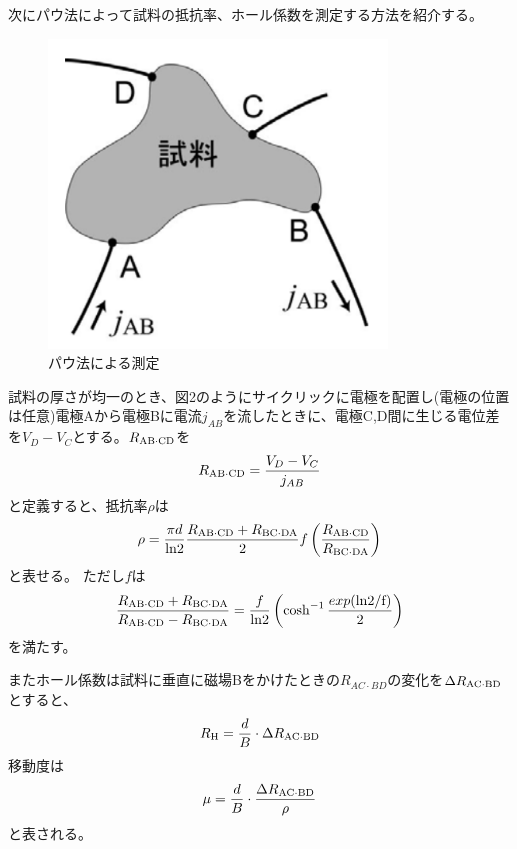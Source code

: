 \documentclass[dvipdfmx]{jsarticle}
\begin{document}
次にパウ法によって試料の抵抗率、ホール係数を測定する方法を紹介する。
\begin{figure}[H]
\begin{center}
\includegraphics[scale = 0.6]{figure2.png}
\caption{パウ法による測定}
\end{center}
\end{figure}
試料の厚さが均一のとき、図2のようにサイクリックに電極を配置し(電極の位置は任意)電極Aから電極Bに電流$j_{AB}$を流したときに、電極C,D間に生じる電位差を$V_{D}-V_{C}$とする。$R_{\rm{AB} \cdot \rm{CD}}$を
\begin{equation}
R_{\rm{AB} \cdot \rm{CD}} = \frac{V_{D}-V_{C}}{j_{AB}}
\end{equation}
と定義すると、抵抗率$\rho$は
\begin{equation}
\rho = \frac{\pi d}{\rm{ln}2}\frac{R_{\rm{AB} \cdot \rm{CD}} + R_{\rm{BC} \cdot \rm{DA}}}{2}f\left(\frac{R_{\rm{AB} \cdot \rm{CD}}}{R_{\rm{BC} \cdot \rm{DA}}}\right)
\end{equation}
と表せる。
ただし$f$は
\begin{equation}
\frac{R_{\rm{AB} \cdot \rm{CD}} + R_{\rm{BC} \cdot \rm{DA}}}{R_{\rm{AB} \cdot \rm{CD}} - R_{\rm{BC} \cdot \rm{DA}}} = \frac{f}{\rm{ln}2}\left(\cosh^{-1}\frac{exp(\rm{ln}2/f)}{2}\right)
\end{equation}
を満たす。


またホール係数は試料に垂直に磁場Bをかけたときの$R_{AC\cdot BD}$の変化を$\Delta R_{\rm{AC}\cdot \rm{BD}}$とすると、
\begin{equation}
R_{\rm{H}} = \frac{d}{B}\cdot \Delta R_{\rm{AC}\cdot \rm{BD}}
\end{equation}
移動度は
\begin{equation}
\mu = \frac{d}{B}\cdot \frac{\Delta R_{\rm{AC}\cdot \rm{BD}}}{\rho}
\end{equation}
と表される。
\end{document}
